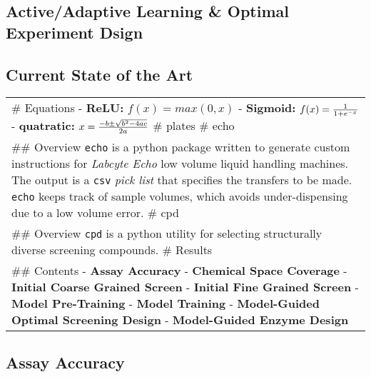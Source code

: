\hypertarget{activeadaptive-learning-optimal-experiment-dsign}{%
\subsection{Active/Adaptive Learning \& Optimal Experiment
Dsign}\label{activeadaptive-learning-optimal-experiment-dsign}}

\hypertarget{current-state-of-the-art}{%
\subsection{Current State of the Art}\label{current-state-of-the-art}}

\begin{longtable}[]{@{}l@{}}
\toprule
\endhead
\begin{minipage}[t]{0.09\columnwidth}\raggedright
\# Equations - \textbf{ReLU:} \(f(x) = max(0, x)\) - \textbf{Sigmoid:}
\(f(x) = {1 \over 1 + e^{-x}}\) - \textbf{quatratic:}
\(x = {-b \pm \sqrt{b^2-4ac} \over 2a}\) \# plates \# echo\strut
\end{minipage}\tabularnewline
\begin{minipage}[t]{0.09\columnwidth}\raggedright
\#\# Overview \texttt{echo} is a python package written to generate
custom instructions for \emph{Labcyte Echo} low volume liquid handling
machines. The output is a \texttt{csv} \emph{pick list} that specifies
the transfers to be made. \texttt{echo} keeps track of sample volumes,
which avoids under-dispensing due to a low volume error. \# cpd\strut
\end{minipage}\tabularnewline
\begin{minipage}[t]{0.09\columnwidth}\raggedright
\#\# Overview \texttt{cpd} is a python utility for selecting
structurally diverse screening compounds. \# Results\strut
\end{minipage}\tabularnewline
\begin{minipage}[t]{0.09\columnwidth}\raggedright
\#\# Contents - \textbf{Assay Accuracy} - \textbf{Chemical Space
Coverage} - \textbf{Initial Coarse Grained Screen} - \textbf{Initial
Fine Grained Screen} - \textbf{Model Pre-Training} - \textbf{Model
Training} - \textbf{Model-Guided Optimal Screening Design} -
\textbf{Model-Guided Enzyme Design}\strut
\end{minipage}\tabularnewline
\bottomrule
\end{longtable}

\hypertarget{assay-accuracy}{%
\subsection{Assay Accuracy}\label{assay-accuracy}}

